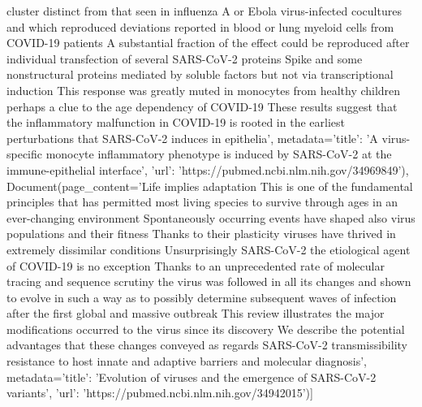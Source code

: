 cluster distinct from that seen in influenza A or Ebola virus-infected cocultures and which reproduced deviations reported in blood or lung myeloid cells from COVID-19 patients A substantial fraction of the effect could be reproduced after individual transfection of several SARS-CoV-2 proteins Spike and some nonstructural proteins mediated by soluble factors but not via transcriptional induction This response was greatly muted in monocytes from healthy children perhaps a clue to the age dependency of COVID-19 These results suggest that the inflammatory malfunction in COVID-19 is rooted in the earliest perturbations that SARS-CoV-2 induces in epithelia', metadata={'title': 'A virus-specific monocyte inflammatory phenotype is induced by SARS-CoV-2 at the immune-epithelial interface', 'url': 'https://pubmed.ncbi.nlm.nih.gov/34969849'}), Document(page\_content='Life implies adaptation This is one of the fundamental principles that has permitted most living species to survive through ages in an ever-changing environment Spontaneously occurring events have shaped also virus populations and their fitness Thanks to their plasticity viruses have thrived in extremely dissimilar conditions Unsurprisingly SARS-CoV-2 the etiological agent of COVID-19 is no exception Thanks to an unprecedented rate of molecular tracing and sequence scrutiny the virus was followed in all its changes and shown to evolve in such a way as to possibly determine subsequent waves of infection after the first global and massive outbreak This review illustrates the major modifications occurred to the virus since its discovery We describe the potential advantages that these changes conveyed as regards SARS-CoV-2 transmissibility resistance to host innate and adaptive barriers and molecular diagnosis', metadata={'title': 'Evolution of viruses and the emergence of SARS-CoV-2 variants', 'url': 'https://pubmed.ncbi.nlm.nih.gov/34942015'})]


